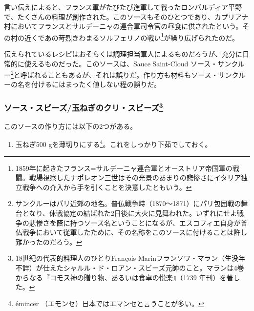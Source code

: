 \begin{recette}
言い伝えによると、フランス軍がたびたび進軍して戦ったロンバルディア平野で、たくさんの料理が創作された。このソースもそのひとつであり、カプリアナ村においてフランスとサルデーニャの連合軍司令官の昼食に供されたという。その村の近くであの苛烈きわまるソルフェリノの戦い\footnote{1859年に起きたフランス=サルデーニャ連合軍とオーストリア帝国軍の戦闘。戦場視察したナポレオン三世はその光景のあまりの悲惨さにイタリア独立戦争への介入から手を引くことを決意したともいう。}が繰り広げられたのだ。

伝えられているレシピはおそらくは調理担当軍人によるものだろうが、充分に日常的に使えるものだった。このソースは、Sauce
Saint-Cloud ソース・サンクルー\footnote{サンクルーはパリ近郊の地名。普仏戦争時（1870〜1871）にパリ包囲戦の舞台となり、休戦協定の結ばれた2日後に大火に見舞われた。いずれにせよ戦争の悲惨さを蔭に持つソース名ということになるが、エスコフィエ自身が普仏戦争において従軍したために、その名称をこのソースに付けることは許し難かったのだろう。}と呼ばれることもあるが、それは誤りだ。作り方も材料もソース・サンクルーの名を付けるにはまったく値しない程の誤りだ。

\hypertarget{sauce-soubise}{%
\subsubsection[ソース・スビーズ/玉ねぎのクリ・スビーズ]{\texorpdfstring{ソース・スビーズ/玉ねぎのクリ・スビーズ\footnote{18世紀の代表的料理人のひとりFrançois
  Marinフランソワ・マラン（生没年不詳）が仕えたシャルル・ド・ロアン・スビーズ元帥のこと。マランは4巻からなる『コモス神の贈り物、あるいは食卓の悦楽』（1739
  年刊）を著した。}}{ソース・スビーズ/玉ねぎのクリ・スビーズ}}\label{sauce-soubise}}



このソースの作り方には以下の2つがある。

\begin{enumerate}
\def\labelenumi{\arabic{enumi}.}
\tightlist
\item
  玉ねぎ500 gを薄切りにする\footnote{émincer
    （エモンセ）日本ではエマンセと言うことが多い。}。これをしっかり下茹でしておく。
\end{enumerate}


\end{recette}
